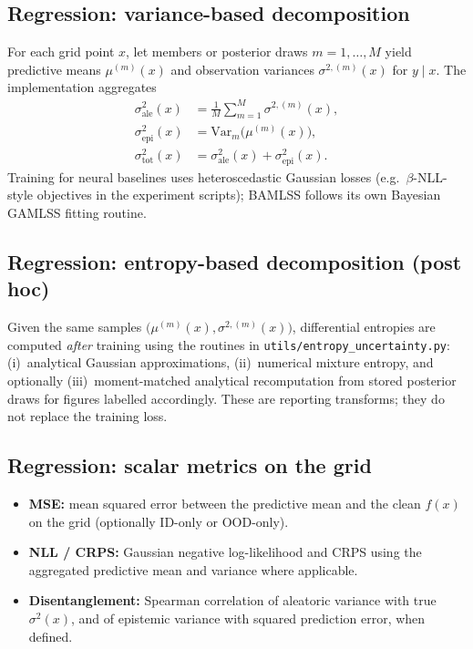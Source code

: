 \subsection{Regression: variance-based decomposition}
\label{sec:reg-variance}

For each grid point $x$, let members or posterior draws $m=1,\ldots,M$ yield predictive means $\mu^{(m)}(x)$ and observation variances $\sigma^{2,(m)}(x)$ for $y\mid x$. The implementation aggregates
\begin{align}
  \sigma^2_{\mathrm{ale}}(x) &= \frac{1}{M}\sum_{m=1}^M \sigma^{2,(m)}(x), \\
  \sigma^2_{\mathrm{epi}}(x) &= \mathrm{Var}_m\bigl(\mu^{(m)}(x)\bigr), \\
  \sigma^2_{\mathrm{tot}}(x) &= \sigma^2_{\mathrm{ale}}(x) + \sigma^2_{\mathrm{epi}}(x).
\end{align}
Training for neural baselines uses heteroscedastic Gaussian losses (e.g.\ $\beta$-NLL-style objectives in the experiment scripts); BAMLSS follows its own Bayesian GAMLSS fitting routine.

\subsection{Regression: entropy-based decomposition (post hoc)}
\label{sec:reg-entropy}

Given the same samples $\bigl(\mu^{(m)}(x),\sigma^{2,(m)}(x)\bigr)$, differential entropies are computed \emph{after} training using the routines in \texttt{utils/entropy\_uncertainty.py}: (i)~analytical Gaussian approximations, (ii)~numerical mixture entropy, and optionally (iii)~moment-matched analytical recomputation from stored posterior draws for figures labelled accordingly. These are reporting transforms; they do not replace the training loss.

\subsection{Regression: scalar metrics on the grid}
\label{sec:reg-scalars}

\begin{itemize}
  \item \textbf{MSE:} mean squared error between the predictive mean and the clean $f(x)$ on the grid (optionally ID-only or OOD-only).
  \item \textbf{NLL / CRPS:} Gaussian negative log-likelihood and CRPS using the aggregated predictive mean and variance where applicable.
  \item \textbf{Disentanglement:} Spearman correlation of aleatoric variance with true $\sigma^2(x)$, and of epistemic variance with squared prediction error, when defined.
\end{itemize}

